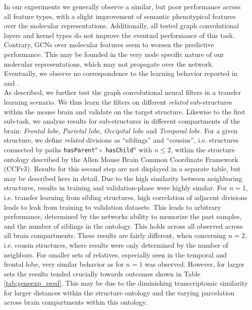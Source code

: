 \documentclass[]{article}
\begin{document}
In our experiments we generally observe a similar, but poor performance across all feature types, with a slight improvement of semantic phenotypical features over the molecular representations. Additionally, all tested graph convolutional layers and kernel types do not improve the eventual performance of this task. Contrary, GCNs over molecular features seem to worsen the predictive performance. This may be founded in the very node specific nature of our molecular representations, which may not propagate over the network. Eventually, we observe no correspondence to the learning behavior reported in \citet{schulte2021integration} and \citet{wang2021mogonet}.\\

As described, we further test the graph convolutional neural filters in a transfer learning scenario. We thus learn the filters on different \textit{related} sub-structures within the mouse brain and validate on the target structure. Likewise to the first sub-task, we analyze results for sub-structures in different compartments of the brain: \textit{Frontal lobe}, \textit{Parietal lobe}, \textit{Occipital lobe } and \textit{Temporal lobe}.
For a given structure, we define \textit{related} divisions as ``siblings'' and ``cousins'', i.e. structures connected by paths \verb*|hasParent|$^n \circ$ \verb*|hasChild|$^n$ with $n\leq2$, within the structure ontology described by the Allen Mouse Brain Common Coordinate Framework (CCFv3). 
Results for this second step are not displayed in a separate table, but may be described here in detail. Due to the high similarity between neighboring structures, results in training and validation-phase were highly similar. For $n=1$, i.e. transfer learning from sibling structures, high correlation of adjacent divisions leads to leak from training to validation datasets. This leads to arbitrary performance, determined by the networks ability to memorize the past samples, and the number of siblings in the ontology. This holds across all observed across all brain compartments.
These results are fairly different, when concerning $n=2$, i.e. cousin structures, where results were only determined by the number of neighbors. For smaller sets of relatives, especially seen in the temporal and frontal lobe, very similar behavior as for $n=1$ was observed. However, for larger sets the results tended crucially towards outcomes shown in Table \ref{tab:geneexp_pred}. This may be due to the diminishing transcriptomic similarity for larger distances within the structure ontology and the varying parcelation across brain compartments within this ontology. \\
\end{document}
